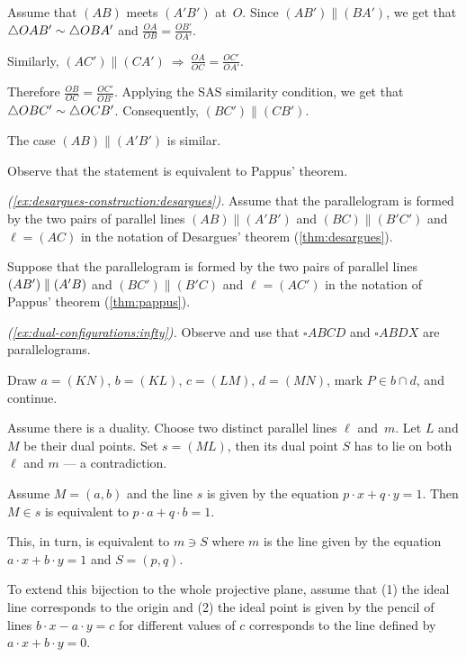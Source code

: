 Assume that $(AB)$ meets $(A'B')$ at~$O$.
Since $(AB')\parallel (BA')$, we get that $\triangle OAB'\sim\triangle OBA'$
and
$\frac{OA}{OB}=\frac{OB'}{OA'}$.

Similarly, $(AC')\parallel (CA')\ \Longrightarrow\ \frac{OA}{OC}=\frac{OC'}{OA'}$.

Therefore
$\frac{OB}{OC}=\frac{OC'}{OB'}$.
Applying the SAS similarity condition, we get that
$\triangle OBC'\sim\triangle OCB'$.
Consequently, $(BC')\parallel (CB')$.

The case $(AB)\parallel(A'B')$ is similar.

 Observe that the statement is equivalent to Pappus' theorem.

\parbf{\ref{ex:desargues-construction};} \textit{(\ref{ex:desargues-construction:desargues}).}
Assume that the parallelogram is formed by the two pairs of parallel lines $(AB)\parallel (A'B')$ and $(BC)\parallel(B'C')$ and $\ell=(AC)$ in the notation of Desargues' theorem (\ref{thm:desargues}).

 Suppose that the parallelogram is formed by the two pairs of parallel lines $(AB')\parallel (A'B)$ and $(BC')\parallel(B'C)$ and $\ell=(AC')$ in the notation of Pappus' theorem (\ref{thm:pappus}).

\parbf{\ref{ex:dual-configurations};}
\textit{(\ref{ex:dual-configurations:infty}).} Observe and use that $\square ABCD$ and $\square ABDX$ are parallelograms.

Draw $a=(KN)$, $b=(KL)$, $c=(LM)$, $d=(MN)$, mark $P\in b\cap d$, and continue.

Assume there is a duality.
Choose two distinct parallel lines $\ell$ and~$m$.
Let $L$ and $M$ be their dual points.
Set $s=(ML)$, then its dual point $S$ has to lie on both $\ell$ and $m$ --- a contradiction.

Assume $M=(a,b)$ 
and the line $s$ is given by the equation $p\cdot x+q\cdot y=1$.
Then $M\in s$ is equivalent to $p\cdot a+q\cdot b=1$.

This, in turn, is equivalent to $m\ni S$
where $m$ is the line given by the equation 
$a\cdot x+b\cdot y=1$ and $S=(p,q)$.

To extend this bijection to the whole projective plane, assume that 
(1) the ideal line corresponds to the origin 
and (2) the ideal point is given by the pencil of lines $b\cdot x-a\cdot y=c$ for different values of $c$ corresponds to the line defined by $a\cdot x+b\cdot y=0$.

